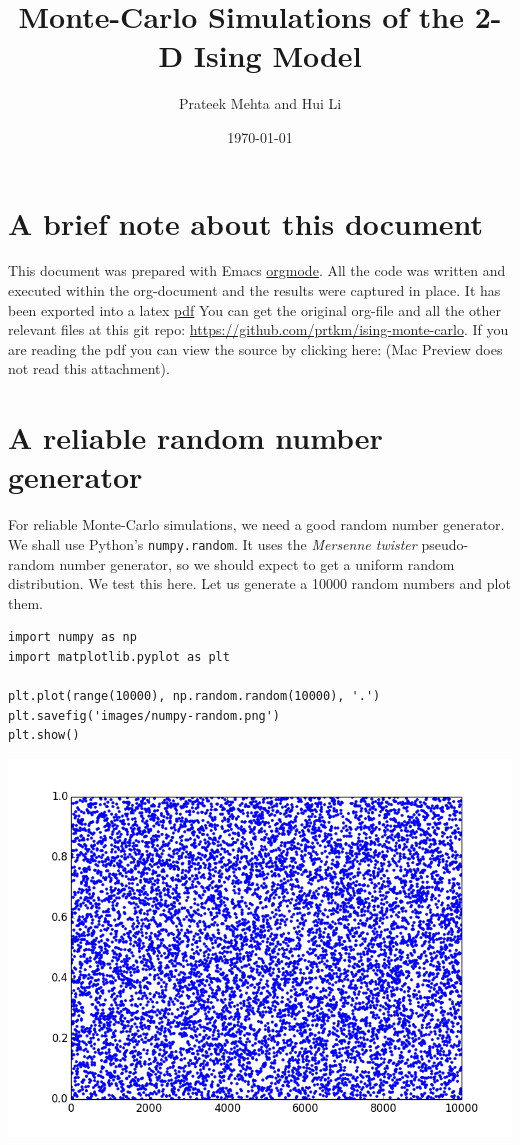 \documentclass{article}
\author{Prateek Mehta and Hui Li}
\date{\today}
\title{Monte-Carlo Simulations of the 2-D Ising Model}
\begin{document}
\maketitle
\tableofcontents

\section{A brief note about this document}
\label{sec-1}

This document was prepared with Emacs \href{http://orgmode.org}{orgmode}. All the code was written and executed within the org-document and the results were captured in place. It has been exported into a latex \href{./ising-monte-carlo.pdf}{pdf} You can get the original org-file and all the other relevant files at this git repo: \url{https://github.com/prtkm/ising-monte-carlo}. If you are reading the pdf you can view the source by clicking here:  (Mac Preview does not read this attachment).

\section{A reliable random number generator}
\label{sec-2}

For reliable Monte-Carlo simulations, we need a good random number generator. We shall use  Python's \texttt{numpy.random}. It uses the \emph{Mersenne twister} pseudo-random number generator, so we should expect to get a uniform random distribution. We test this here. Let us generate a 10000 random numbers and plot them.

\begin{verbatim}
import numpy as np
import matplotlib.pyplot as plt

plt.plot(range(10000), np.random.random(10000), '.')
plt.savefig('images/numpy-random.png')
plt.show()
\end{verbatim}

\includegraphics[width=.9\linewidth]{./images/numpy-random.png}
\end{document}
